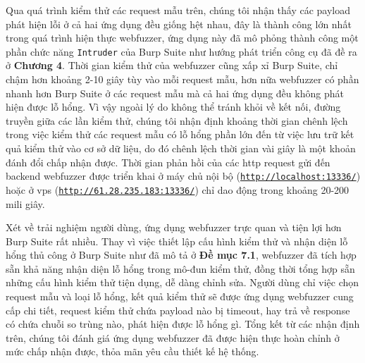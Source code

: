 Qua quá trình kiểm thử các request mẫu trên, chúng tôi nhận thấy các payload phát hiện lỗi ở cả hai ứng dụng đều giống hệt nhau, đây là thành công lớn nhất trong quá trình hiện thực webfuzzer, ứng dụng này đã mô phỏng thành công một phần chức năng \texttt{Intruder} của Burp Suite như hướng phát triển công cụ đã đề ra ở \textbf{Chương 4}. Thời gian kiểm thử của webfuzzer cũng xấp xỉ Burp Suite, chỉ chậm hơn khoảng 2-10 giây tùy vào mỗi request mẫu, hơn nữa webfuzzer có phần nhanh hơn Burp Suite ở các request mẫu mà cả hai ứng dụng đều không phát hiện được lỗ hổng. Vì vậy ngoài lý do không thể tránh khỏi về kết nối, đường truyền giữa các lần kiểm thử, chúng tôi nhận định khoảng thời gian chênh lệch trong việc kiểm thử các request mẫu có lỗ hổng phần lớn đến từ việc lưu trữ kết quả kiểm thử vào cơ sở dữ liệu, do đó chênh lệch thời gian vài giây là một khoản đánh đổi chấp nhận được. Thời gian phản hồi của các \acrshort{http} request gửi đến backend webfuzzer được triển khai ở máy chủ nội bộ (\href{http://localhost:13336/}{\texttt{http://localhost:13336/}}) hoặc ở \acrshort{vps} (\href{http://61.28.235.183:13336/}{\texttt{http://61.28.235.183:13336/}}) chỉ dao động trong khoảng 20-200 mili giây.\par
Xét về trải nghiệm người dùng, ứng dụng webfuzzer trực quan và tiện lợi hơn Burp Suite rất nhiều. Thay vì việc thiết lập cấu hình kiểm thử và nhận diện lỗ hổng thủ công ở Burp Suite như đã mô tả ở \textbf{Đề mục 7.1}, webfuzzer đã tích hợp sẵn khả năng nhận diện lỗ hổng trong mô-đun kiểm thử, đồng thời tổng hợp sẵn những cấu hình kiểm thử tiện dụng, dễ dàng chỉnh sửa. Người dùng chỉ việc chọn request mẫu và loại lỗ hổng, kết quả kiểm thử sẽ được ứng dụng webfuzzer cung cấp chi tiết, request kiểm thử chứa payload nào bị timeout, hay trả về response có chứa chuỗi so trùng nào, phát hiện được lỗ hổng gì. Tổng kết từ các nhận định trên, chúng tôi đánh giá ứng dụng webfuzzer đã được hiện thực hoàn chỉnh ở mức chấp nhận được, thỏa mãn yêu cầu thiết kế hệ thống.